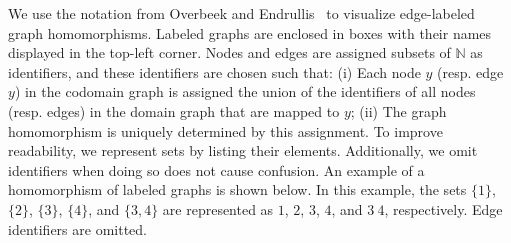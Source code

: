 \begin{notation}
    \label{notation:graph_homomorphism}
    We use the notation from Overbeek and Endrullis~\cite[Notation 1]{overbeek2023apbpotutorial} to visualize edge-labeled graph homomorphisms. Labeled graphs are enclosed in boxes with their names displayed in the top-left corner. Nodes and edges are assigned subsets of \(\mathbb{N}\) as identifiers, and these identifiers are chosen such that: (i) Each node \( y \) (resp. edge \( y \)) in the codomain graph is assigned the union of the identifiers of all nodes (resp. edges) in the domain graph that are mapped to \( y \); (ii) The graph homomorphism is uniquely determined by this assignment. To improve readability, we represent sets by listing their elements. Additionally, we omit identifiers when doing so does not cause confusion. An example of a homomorphism of labeled graphs is shown below.
    In this example, the sets \(\{1\}\), \(\{2\}\), \(\{3\}\), \(\{4\}\), and \(\{3,4\}\) are represented as \(1\), \(2\), \(3\), \(4\), and \(3\ 4\), respectively. Edge identifiers are omitted.
    \begin{center}
    \end{center}
\end{notation} 


